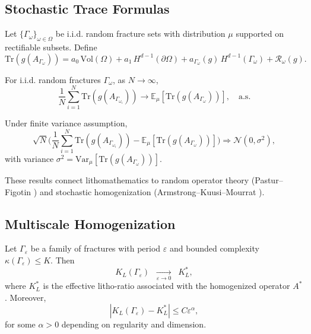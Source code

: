 \subsection*{Stochastic Trace Formulas}
\begin{definition}
Let $\{\Gamma_\omega\}_{\omega\in\Omega}$ be i.i.d. random fracture sets with
distribution $\mu$ supported on rectifiable subsets. Define
\[
\mathrm{Tr}(g(A_{\Gamma_\omega})) =
a_0 \, \mathrm{Vol}(\Omega) +
a_1 \, H^{d-1}(\partial\Omega) +
a_{\Gamma_\omega}(g) \, H^{d-1}(\Gamma_\omega) +
\mathcal{R}_\omega(g).
\]
\end{definition}

\begin{theorem}
\label{thm:lln-trace}
For i.i.d. random fractures $\Gamma_\omega$, as $N\to\infty$,
\[
\frac{1}{N} \sum_{i=1}^N \mathrm{Tr}(g(A_{\Gamma_{\omega_i}}))
\to \mathbb{E}_\mu[\mathrm{Tr}(g(A_{\Gamma_\omega}))],
\quad \text{a.s.}
\]
\end{theorem}

\begin{theorem}
\label{thm:clt-trace}
Under finite variance assumption,
\[
\sqrt{N}\Bigg(
\frac{1}{N}\sum_{i=1}^N \mathrm{Tr}(g(A_{\Gamma_{\omega_i}})) -
\mathbb{E}_\mu[\mathrm{Tr}(g(A_{\Gamma_\omega}))]
\Bigg)
\Longrightarrow \mathcal{N}(0,\sigma^2),
\]
with variance $\sigma^2 = \mathrm{Var}_\mu[\mathrm{Tr}(g(A_{\Gamma_\omega}))]$.
\end{theorem}

\begin{remark}
These results connect lithomathematics to random operator theory
(Pastur–Figotin \cite{PasturFigotin1992}) and stochastic homogenization
(Armstrong–Kuusi–Mourrat \cite{ArmstrongKuusiMourrat2017}).
\end{remark}

\subsection*{Multiscale Homogenization}
\begin{theorem}
\label{thm:homogenization}
Let $\Gamma_\varepsilon$ be a family of fractures with period $\varepsilon$ and
bounded complexity $\kappa(\Gamma_\varepsilon)\leq K$. Then
\[
K_L(\Gamma_\varepsilon) \;\;\xrightarrow[\varepsilon\to 0]{}\;\; K_L^*,
\]
where $K_L^*$ is the effective litho-ratio associated with the homogenized
operator $A^*$. Moreover,
\[
|K_L(\Gamma_\varepsilon) - K_L^*| \leq C \varepsilon^\alpha,
\]
for some $\alpha>0$ depending on regularity and dimension.
\end{theorem}

